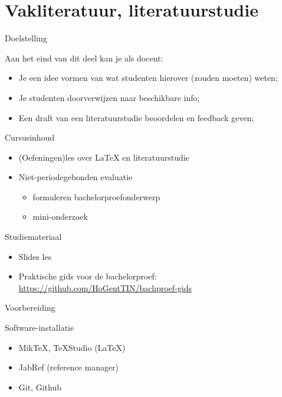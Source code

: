\section{Vakliteratuur, literatuurstudie}


\begin{frame}{Doelstelling}
  
  Aan het eind van dit deel kan je als docent:
  
  \begin{itemize}
    \item Je een idee vormen van wat studenten hierover (zouden moeten) weten;
    \item Je studenten doorverwijzen naar beschikbare info;
    \item Een draft van een literatuurstudie beoordelen en feedback geven;
  \end{itemize}
\end{frame}

\begin{frame}{Cursusinhoud}
  \begin{itemize}
    \item (Oefeningen)les over \LaTeX{} en literatuurstudie
    \item Niet-periodegebonden evaluatie
      \begin{itemize}
        \item formuleren bachelorproefonderwerp
        \item mini-onderzoek
      \end{itemize}
  \end{itemize}
\end{frame}

\begin{frame}{Studiemateriaal}
  \begin{itemize}
    \item Slides les
    \item Praktische gids voor de bachelorproef: \url{https://github.com/HoGentTIN/bachproef-gids}
  \end{itemize}
\end{frame}

\begin{frame}{Voorbereiding}

  Software-installatie
  
  \begin{itemize}
    \item Mik\TeX{}, \TeX{}Studio (\LaTeX{})
    \item JabRef (reference manager)
    \item Git, Github
  \end{itemize}
\end{frame}

